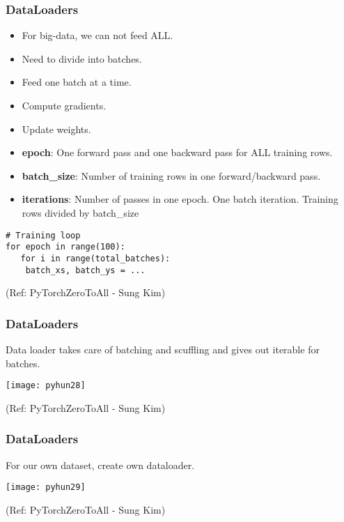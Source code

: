 
\begin{frame}[fragile] \frametitle{DataLoaders}
\begin{itemize}
\item For big-data, we can not feed ALL. 
\item Need to divide into batches. 
\item Feed one batch at a time. 
\item Compute gradients.
\item Update weights.
\item \textbf{epoch}: One forward pass and one backward pass for ALL training rows.
\item \textbf{batch\_size}: Number of training rows in one forward/backward pass.
\item \textbf{iterations}: Number of passes in one epoch. One batch iteration. Training rows divided by batch\_size
\end{itemize}
\begin{lstlisting}
# Training loop
for epoch in range(100):
   for i in range(total_batches):
   	batch_xs, batch_ys = ...
\end{lstlisting}

\tiny{(Ref: PyTorchZeroToAll  - Sung Kim)}
\end{frame}

\begin{frame}[fragile] \frametitle{DataLoaders}
Data loader takes care of batching and scuffling and gives out iterable for batches.
\begin{center}
\texttt{[image: pyhun28]}
\end{center}

\tiny{(Ref: PyTorchZeroToAll  - Sung Kim)}
\end{frame}

\begin{frame}[fragile] \frametitle{DataLoaders}
For our own dataset, create own dataloader.
\begin{center}
\texttt{[image: pyhun29]}
\end{center}

\tiny{(Ref: PyTorchZeroToAll  - Sung Kim)}
\end{frame}

